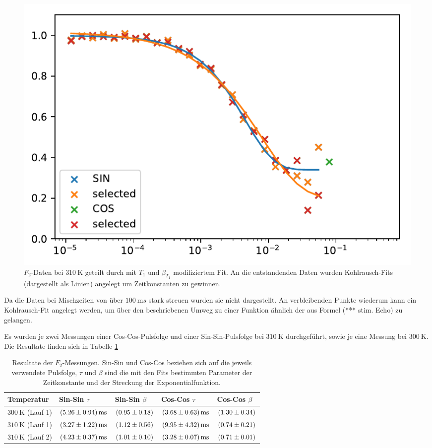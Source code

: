 \begin{figure}
	\begin{center}
		\includegraphics[width=.9\textwidth]{graphics/plots/F2/f2_fit.pdf}
	\end{center}
	\caption{$F_2$-Daten bei $\SI{310}{\kelvin}$ geteilt durch mit $T_1$ und $\beta_{T_1}$ modifiziertem Fit. An die entstandenden Daten wurden Kohlrausch-Fits (dargestellt als Linien) angelegt um Zeitkonstanten zu gewinnen.} \label{fig:res:F_2_T_1}
\end{figure}

Da die Daten bei Mischzeiten von über $\SI{100}{\milli s}$ stark streuen wurden sie nicht dargestellt. An verbleibenden Punkte wiederum kann ein Kohlrausch-Fit angelegt werden, um über den beschriebenen Umweg zu einer Funktion ähnlich der aus Formel (*** stim. Echo) zu gelangen.

Es wurden je zwei Messungen einer Cos-Cos-Pulsfolge und einer Sin-Sin-Pulsfolge bei $\SI{310}{\kelvin}$ durchgeführt, sowie je eine Messung bei $\SI{300}{\kelvin}$. Die Resultate finden sich in Tabelle \ref{tab:res:F_2}

\begin{table}[H]
	\centering
	\begin{tabular}{lllll}
		\hline
		Temperatur & Sin-Sin $\tau$ & Sin-Sin $\beta$ & Cos-Cos $\tau$ & Cos-Cos $\beta$ \\ \hline
		$\SI{300}{\kelvin}$ (Lauf 1) & $\SI{5.26 (94)}{\milli s}$ & $\SI{0.95 (18)}{}$ & $\SI{3.68 (63)}{\milli s}$ & $\SI{1.30 (34)}{}$ \\
		$\SI{310}{\kelvin}$ (Lauf 1) & $\SI{3.27 (122)}{\milli s}$ & $\SI{1.12 (56)}{}$ & $\SI{9.95 (432)}{\milli s}$ & $\SI{0.74 (21)}{}$ \\
		$\SI{310}{\kelvin}$ (Lauf 2) & $\SI{4.23 (37)}{\milli s}$ & $\SI{1.01 (10)}{}$ & $\SI{3.28 (7)}{\milli s}$ & $\SI{0.71 (1)}{}$ \\
		 \hline
	\end{tabular}
	\caption{Resultate der $F_2$-Messungen. Sin-Sin und Cos-Cos beziehen sich auf die jeweils verwendete Pulsfolge, $\tau$ und $\beta$ sind die mit den Fits bestimmten Parameter der Zeitkonstante und der Streckung der Exponentialfunktion. \label{tab:res:F_2}}
\end{table}

